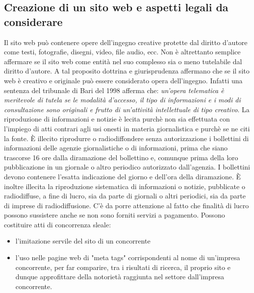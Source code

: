\subsection{Creazione di un sito web e aspetti legali da considerare}
Il sito web può contenere opere dell'ingegno creative protette dal diritto d'autore come testi, fotografie,
disegni, video, file audio, ecc. \newline
Non è altrettanto semplice affermare se il sito web come entità nel suo complesso sia o meno tutelabile dal
diritto d'autore. A tal proposito dottrina e giurisprudenza affermano che se il sito web è creativo e originale
può essere considerato opera dell'ingegno. Infatti una sentenza del tribunale di Bari del 1998 afferma che: \newline
\emph{un'opera telematica è meritevole di tutela se le modalità d'accesso, il tipo di informazioni e i modi di consultazione
sono originali e frutto di un'attività intellettuale di tipo creativo}.\newline
La riproduzione di informazioni e notizie è lecita purchè non sia effettuata con l'impiego di atti contrari
agli usi onesti in materia giornalistica e purchè se ne citi la fonte. \newline
È illecito riprodurre o radiodiffondere senza autorizzazione i bollettini di informazioni delle agenzie giornalistiche o di informazioni, prima che
siano trascorse 16 ore dalla diramazione del bollettino e, comunque prima della loro pubblicazione in un giornale
o altro periodico autorizzato dall'agenzia. I bollettini devono contenere l'esatta indicazione del giorno e dell'ora della
diramazione. \newline
È inoltre illecita la riproduzione sistematica di informazioni o notizie, pubblicate o radiodiffuse, a fine di lucro,
sia da parte di giornali o altri periodici, sia da parte di imprese di radiodiffusione. C'è da porre attenzione al fatto
che finalità di lucro possono sussistere anche se non sono forniti servizi a pagamento.\newline
\newline
Possono costituire atti di concorrenza sleale:
\begin{itemize}
    \item l'imitazione servile del sito di un concorrente
    \item l'uso nelle pagine web di "meta tags" corrispondenti al nome di un'impresa concorrente,
    per far comparire, tra i risultati di ricerca, il proprio sito e dunque approfittare della notorietà
    raggiunta nel settore dall'impresa concorrente.
\end{itemize}

